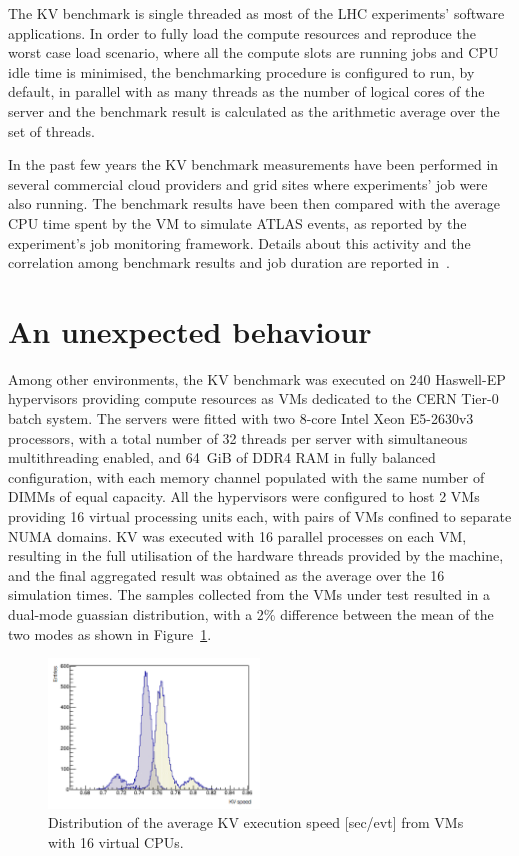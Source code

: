The KV benchmark is single threaded as most of the LHC experiments'
software applications. In order to fully load the compute resources and reproduce
the worst case load scenario, where all the compute slots are running jobs and
CPU idle time is minimised, the benchmarking procedure is configured to run,
by default, in parallel with as many threads as the number of logical cores of
the server and the benchmark result is calculated as the arithmetic average over
the set of threads.


In the past few years the KV benchmark measurements have been performed in several commercial cloud providers and grid sites 
where experiments' job were also running. The  benchmark results have been then compared with the average CPU time spent by the VM to simulate ATLAS events, as reported by the experiment's job monitoring framework. Details about this activity and the correlation among benchmark results and job duration are reported in~\cite{bmk}.




\section{An unexpected behaviour}
Among other environments, the KV benchmark was executed on 240 Haswell-EP hypervisors providing compute
resources as VMs dedicated to the CERN Tier-0 batch system. The servers were
fitted with two 8-core Intel Xeon E5-2630v3 processors, with a total number  
of 32 threads per server with simultaneous multithreading enabled, and 64~GiB    
of DDR4 RAM in fully balanced configuration, with each memory channel populated with
the same number of DIMMs of equal capacity. All the hypervisors were configured 
to host 2 VMs providing 16 virtual processing units each, with pairs of VMs 
confined to separate NUMA domains. KV was executed with 16 parallel processes 
on each VM, resulting in the full utilisation of the hardware threads provided
by the machine, and the final aggregated result was obtained as the average over 
the 16 simulation times. The samples collected from the VMs under test resulted in a dual-mode guassian distribution, with a 2\% difference between the 
mean of the two modes as shown in Figure~\ref{dual-mode-gaussian}.


\begin{figure}[ht]
\begin{center}
\includegraphics[width=0.5\textwidth]{images/dual-mode-gaussian.png}
\end{center}
\caption{\label{dual-mode-gaussian} Distribution of the average KV execution speed [sec/evt] from VMs with 16 virtual CPUs. }
\end{figure}


